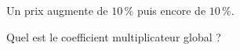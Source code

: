 
Un prix augmente de $10\,\%$ puis encore de $10\,\%$.

Quel est le coefficient multiplicateur global ?

\smallskip

